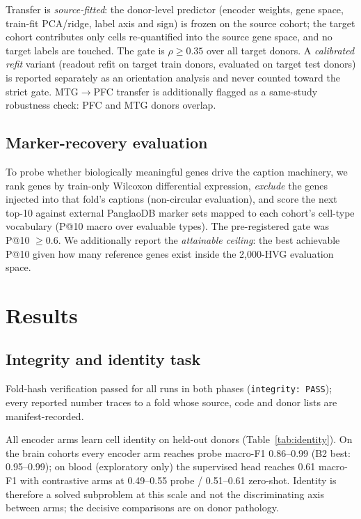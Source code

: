 \documentclass[11pt]{article}
\begin{document}
Transfer is \emph{source-fitted}: the donor-level predictor (encoder
weights, gene space, train-fit PCA/ridge, label axis and sign) is frozen
on the source cohort; the target cohort contributes only cells
re-quantified into the source gene space, and no target labels are
touched. The gate is $\rho\geq0.35$ over all target donors. A
\emph{calibrated refit} variant (readout refit on target train donors,
evaluated on target test donors) is reported separately as an
orientation analysis and never counted toward the strict gate.
MTG$\to$PFC transfer is additionally flagged as a same-study robustness
check: PFC and MTG donors overlap.

\subsection{Marker-recovery evaluation}
\label{sec:marker_methods}

To probe whether biologically meaningful genes drive the caption
machinery, we rank genes by train-only Wilcoxon differential expression,
\emph{exclude} the genes injected into that fold's captions
(non-circular evaluation), and score the next top-10 against external
PanglaoDB marker sets \citep{panglaodb} mapped to each cohort's cell-type
vocabulary (P@10 macro over evaluable types). The pre-registered gate
was P@10 $\geq 0.6$. We additionally report the \emph{attainable
ceiling}: the best achievable P@10 given how many reference genes exist
inside the 2{,}000-HVG evaluation space.

\section{Results}

\subsection{Integrity and identity task}
\label{sec:identity}

Fold-hash verification passed for all runs in both phases
(\texttt{integrity: PASS}); every reported number traces to a fold whose
source, code and donor lists are manifest-recorded.

All encoder arms learn cell identity on held-out donors
(Table~\ref{tab:identity}). On the brain cohorts every encoder arm
reaches probe macro-F1 0.86--0.99 (B2 best: 0.95--0.99); on blood
(exploratory only) the supervised head reaches 0.61 macro-F1 with
contrastive arms at 0.49--0.55 probe / 0.51--0.61 zero-shot. Identity is
therefore a solved subproblem at this scale and not the discriminating
axis between arms; the decisive comparisons are on donor pathology.
\end{document}
